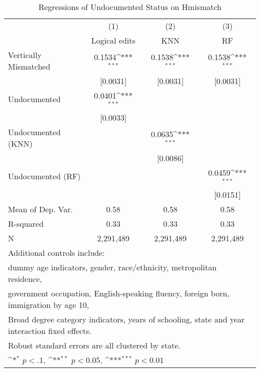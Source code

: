 \begin{table}[htbp]\centering
\def\sym#1{\ifmmode^{#1}\else\(^{#1}\)\fi}
\caption{Regressions of Undocumented Status on Hmismatch}
\begin{tabular}{l*{3}{c}}
\toprule
                    &\multicolumn{1}{c}{(1)}         &\multicolumn{1}{c}{(2)}         &\multicolumn{1}{c}{(3)}         \\
                    &Logical edits         &         KNN         &          RF         \\
\midrule
Vertically Mismatched&      0.1534\sym{***}&      0.1538\sym{***}&      0.1538\sym{***}\\
                    &    [0.0031]         &    [0.0031]         &    [0.0031]         \\
\addlinespace
Undocumented        &      0.0401\sym{***}&                     &                     \\
                    &    [0.0033]         &                     &                     \\
\addlinespace
Undocumented (KNN)  &                     &      0.0635\sym{***}&                     \\
                    &                     &    [0.0086]         &                     \\
\addlinespace
Undocumented (RF)   &                     &                     &      0.0459\sym{***}\\
                    &                     &                     &    [0.0151]         \\
\midrule
Mean of Dep. Var.   &        0.58         &        0.58         &        0.58         \\
R-squared           &        0.33         &        0.33         &        0.33         \\
N                   &   2,291,489         &   2,291,489         &   2,291,489         \\
\bottomrule
\multicolumn{4}{l}{\footnotesize Additional controls include:}\\
\multicolumn{4}{l}{\footnotesize dummy age indicators, gender, race/ethnicity, metropolitan residence,}\\
\multicolumn{4}{l}{\footnotesize government occupation, English-speaking fluency, foreign born, immigration by age 10,}\\
\multicolumn{4}{l}{\footnotesize Broad degree category indicators, years of schooling, state and year interaction fixed effects.}\\
\multicolumn{4}{l}{\footnotesize Robust standard errors are all clustered by state.}\\
\multicolumn{4}{l}{\footnotesize \sym{*} \(p<.1\), \sym{**} \(p<0.05\), \sym{***} \(p<0.01\)}\\
\end{tabular}
\end{table}
